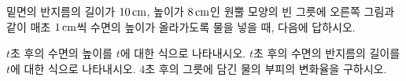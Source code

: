 \noindent\begin{minipage}[t]{0.58\linewidth}\vspace{0pt}\raggedright 밑면의 반지름의 길이가 $10\mkern3mu \mathrm{cm}$, 높이가 $8\mkern3mu \mathrm{cm}$인 원뿔 모양의 빈 그릇에 오른쪽 그림과 같이 매초 $1\mkern3mu \mathrm{cm}$씩 수면의 높이가 올라가도록 물을 넣을 때, 다음에 답하시오.\end{minipage}\hfill\begin{minipage}[t]{0.4\linewidth}\vspace{0pt}\centering \resizebox{\ifdim\width>\linewidth\linewidth\else\width\fi}{!}{}\end{minipage}\par
{} $t$초 후의 수면의 높이를 $t$에 대한 식으로 나타내시오.
 $t$초 후의 수면의 반지름의 길이를 $t$에 대한 식으로 나타내시오.
 $4$초 후의 그릇에 담긴 물의 부피의 변화율을 구하시오.
